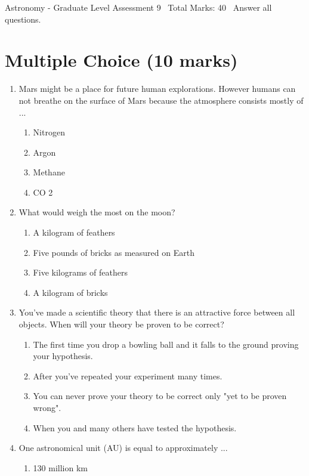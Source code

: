\documentclass[12pt]{article}
\begin{document}
\begin{center}
Astronomy - Graduate Level Assessment 9 \
Total Marks: 40 \
Answer all questions.
\end{center}

\section*{Multiple Choice (10 marks)}
\begin{enumerate}[label=\arabic*.]
\item Mars might be a place for future human explorations. However humans can not breathe on the surface of Mars because the atmosphere consists mostly of ...
\begin{enumerate}[label=(\alph*)]
    \item Nitrogen
    \item Argon
    \item Methane
    \item CO 2
\end{enumerate}
\item What would weigh the most on the moon?
\begin{enumerate}[label=(\alph*)]
    \item A kilogram of feathers
    \item Five pounds of bricks as measured on Earth
    \item Five kilograms of feathers
    \item A kilogram of bricks
\end{enumerate}
\item You've made a scientific theory that there is an attractive force between all objects. When will your theory be proven to be correct?
\begin{enumerate}[label=(\alph*)]
    \item The first time you drop a bowling ball and it falls to the ground proving your hypothesis.
    \item After you've repeated your experiment many times.
    \item You can never prove your theory to be correct only "yet to be proven wrong".
    \item When you and many others have tested the hypothesis.
\end{enumerate}
\item One astronomical unit (AU) is equal to approximately ...
\begin{enumerate}[label=(\alph*)]
    \item 130 million km

\end{enumerate}
\end{enumerate}
\end{document}
